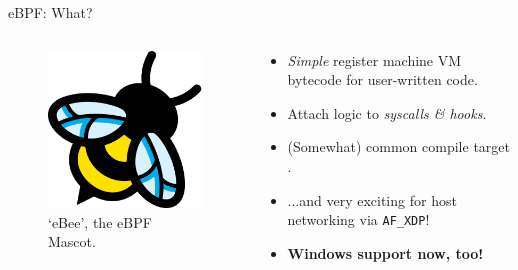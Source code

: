 \documentclass[aspectratio=169,xcolor={dvipsnames}
,handout %
]{beamer}
\begin{document}
\begin{frame}{eBPF: What?}
	\begin{columns}
		\begin{column}{0.4\linewidth}
			\begin{figure}
				\centering
				\includegraphics[width=0.9\linewidth,keepaspectratio]{images/ebpf}
				\caption{`eBee', the eBPF Mascot.}
			\end{figure}
		\end{column}
		\begin{column}{0.6\linewidth}
			\begin{itemize}[<+->]
				\item \emph{Simple} register machine VM bytecode for \alert{user-written code}.
				\item Attach logic to \emph{syscalls \& hooks}.
				\item (Somewhat) common compile target .
				\item ...and very exciting for host networking via \alert{\texttt{AF\_XDP}}!
				\item \tiny \textbf{\alert{Windows} support now, too!}
			\end{itemize}
		\end{column}
	\end{columns}
	
\end{frame}
\end{document}
